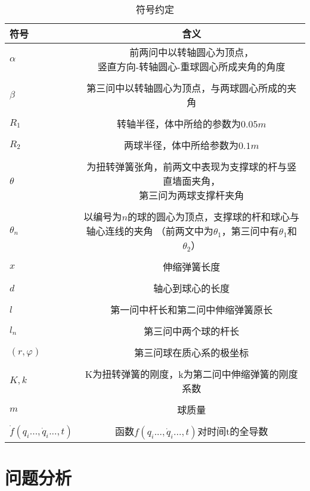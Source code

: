 \documentclass[a4paper,c5size,twoside,UTF8]{ctexart} %
\numberwithin{equation}{section}   %
\begin{document}
\begin{table}[H]
	\centering 
	\caption{\label{tab:test}符号约定}
	\begin{tabular}{lc}
		\toprule
		符号 & 含义  \\
		\midrule
		$\alpha$ & \makecell[c]{前两问中以转轴圆心为顶点， \\ 竖直方向-转轴圆心-重球圆心所成夹角的角度 } \\
		\\
		$\beta$ & 第三问中以转轴圆心为顶点，与两球圆心所成的夹角 \\
		\\
		$R_1$ & 转轴半径，体中所给的参数为$0.05m$ \\
		\\
		$R_2$ & 两球半径，体中所给参数为$0.1m$ \\
		\\
		$\theta$ & \makecell[c]{为扭转弹簧张角，前两文中表现为支撑球的杆与竖直墙面夹角， \\第三问为两球支撑杆夹角} \\
		\\
		$\theta_n$ & \makecell[c]{以编号为$n$的球的圆心为顶点，支撑球的杆和球心与轴心连线的夹角 \\（前两文中为$\theta_1$，第三问中有$\theta_1$和$\theta_2$）} \\
		\\
		$x$ & 伸缩弹簧长度 \\
		\\
		$d$ & 轴心到球心的长度 \\
		\\
		$l$ & 第一问中杆长和第二问中伸缩弹簧原长 \\
		\\
		$l_n$ & 第三问中两个球的杆长 \\
		\\
		$(r,\varphi)$ & 第三问球在质心系的极坐标 \\
		\\
		$K,k$ & K为扭转弹簧的刚度，k为第二问中伸缩弹簧的刚度系数 \\
		\\
		$m$ & 球质量\\
		\\
		$\dot{f}\left(q_i...,\dot{q}_i...,t\right)$ & 函数$f\left(q_i...,\dot{q}_i...,t\right)$对时间t的全导数\\
		\bottomrule
	\end{tabular}
\end{table}

\section{问题分析}
\end{document}
